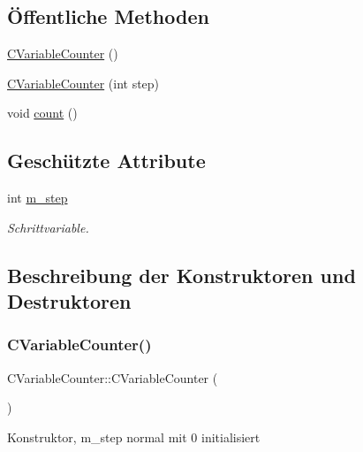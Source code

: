 \subsection*{Öffentliche Methoden}
\begin{DoxyCompactItemize}
\item 
\hyperlink{class_c_variable_counter_a76f4aa9bc231429b02678050eec85518}{C\+Variable\+Counter} ()
\item 
\hyperlink{class_c_variable_counter_a80ffababfaed8740dcccc1958416dc81}{C\+Variable\+Counter} (int step)
\item 
void \hyperlink{class_c_variable_counter_a693c27202acd18d53c4642ce642927bc}{count} ()
\end{DoxyCompactItemize}
\subsection*{Geschützte Attribute}
\begin{DoxyCompactItemize}
\item 
int \hyperlink{class_c_variable_counter_a970fd88636f33c50c7c3005f92bebf87}{m\+\_\+step}
\begin{DoxyCompactList}\small\item\em Schrittvariable. \end{DoxyCompactList}\end{DoxyCompactItemize}


\subsection{Beschreibung der Konstruktoren und Destruktoren}
\mbox{\label{class_c_variable_counter_a76f4aa9bc231429b02678050eec85518}} 
\subsubsection{\texorpdfstring{C\+Variable\+Counter()}{CVariableCounter()}\hspace{0.1cm}{\footnotesize\ttfamily [1/2]}}
{\footnotesize\ttfamily C\+Variable\+Counter\+::\+C\+Variable\+Counter (\begin{DoxyParamCaption}{ }\end{DoxyParamCaption})}

Konstruktor, m\+\_\+step normal mit 0 initialisiert \mbox{\label{class_c_variable_counter_a80ffababfaed8740dcccc1958416dc81}} 
